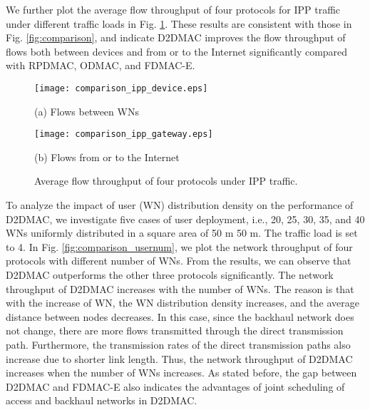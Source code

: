 \documentclass[journal]{IEEEtran}
\begin{document}
We further plot the average flow throughput of four protocols for IPP traffic under different traffic
loads in Fig. \ref{fig:comparison_flow}. These results are consistent with those in Fig.
\ref{fig:comparison}, and indicate D2DMAC improves the flow throughput of flows both between
devices and from or to the Internet significantly compared with RPDMAC, ODMAC, and FDMAC-E.





\begin{figure}[htbp]
\begin{minipage}[t]{0.5\linewidth}
\centering
\texttt{[image: comparison\_ipp\_device.eps]}
\centerline{\small (a) Flows between WNs}
\end{minipage}\begin{minipage}[t]{0.5\linewidth}
\centering
\texttt{[image: comparison\_ipp\_gateway.eps]}
\centerline{\small (b) Flows from or to the Internet}
\end{minipage}\caption{Average flow throughput of four protocols under IPP traffic.}
\label{fig:comparison_flow} \vspace*{-3mm}
\end{figure}


To analyze the impact of user (WN) distribution density on the performance of D2DMAC, we investigate five cases of user deployment, i.e., 20, 25, 30, 35, and 40 WNs uniformly distributed in a square area of 50 m 
50 m. The traffic load is set to 4. In Fig. \ref{fig:comparison_usernum}, we plot the network throughput of four protocols with different number of WNs. From the results, we can observe that D2DMAC outperforms the other three protocols significantly. The network throughput of D2DMAC increases with the number of WNs. The reason is that with the increase of WN, the WN distribution density increases, and the average distance between nodes decreases. In this case, since the backhaul network does not change, there are more flows transmitted through the direct transmission path. Furthermore, the transmission rates of the direct transmission paths also increase due to shorter link length. Thus, the network throughput of D2DMAC increases when the number of WNs increases. As stated before, the gap between D2DMAC and FDMAC-E also indicates the advantages of joint scheduling of access and backhaul networks in D2DMAC.
\end{document}
